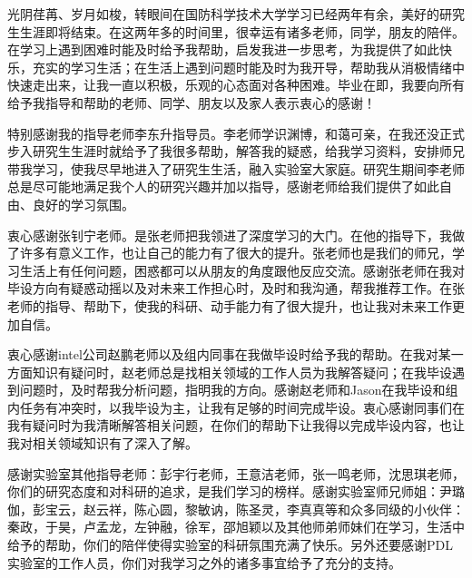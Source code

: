 

\begin{ack}
  光阴荏苒、岁月如梭，转眼间在国防科学技术大学学习已经两年有余，美好的研究生生涯即将结束。在这两年多的时间里，很幸运有诸多老师，同学，朋友的陪伴。在学习上遇到困难时能及时给予我帮助，启发我进一步思考，为我提供了如此快乐，充实的学习生活；在生活上遇到问题时能及时为我开导，帮助我从消极情绪中快速走出来，让我一直以积极，乐观的心态面对各种困难。毕业在即，我要向所有给予我指导和帮助的老师、同学、朋友以及家人表示衷心的感谢！
  
  特别感谢我的指导老师李东升指导员。李老师学识渊博，和蔼可亲，在我还没正式步入研究生生涯时就给予了我很多帮助，解答我的疑惑，给我学习资料，安排师兄带我学习，使我尽早地进入了研究生生活，融入实验室大家庭。研究生期间李老师总是尽可能地满足我个人的研究兴趣并加以指导，感谢老师给我们提供了如此自由、良好的学习氛围。
  
  衷心感谢张钊宁老师。是张老师把我领进了深度学习的大门。在他的指导下，我做了许多有意义工作，也让自己的能力有了很大的提升。张老师也是我们的师兄，学习生活上有任何问题，困惑都可以从朋友的角度跟他反应交流。感谢张老师在我对毕设方向有疑惑动摇以及对未来工作担心时，及时和我沟通，帮我推荐工作。在张老师的指导、帮助下，使我的科研、动手能力有了很大提升，也让我对未来工作更加自信。
  
  衷心感谢intel公司赵鹏老师以及组内同事在我做毕设时给予我的帮助。在我对某一方面知识有疑问时，赵老师总是找相关领域的工作人员为我解答疑问；在我毕设遇到问题时，及时帮我分析问题，指明我的方向。感谢赵老师和Jason在我毕设和组内任务有冲突时，以我毕设为主，让我有足够的时间完成毕设。衷心感谢同事们在我有疑问时为我清晰解答相关问题，在你们的帮助下让我得以完成毕设内容，也让我对相关领域知识有了深入了解。
  
  感谢实验室其他指导老师：彭宇行老师，王意洁老师，张一鸣老师，沈思琪老师，你们的研究态度和对科研的追求，是我们学习的榜样。感谢实验室师兄师姐：尹璐伽，彭宝云，赵云祥，陈心圆，黎敏讷，陈圣灵，李真真等和众多同级的小伙伴：秦政，于昊，卢孟龙，左钟融，徐军，邵旭颖以及其他师弟师妹们在学习，生活中给予的帮助，你们的陪伴使得实验室的科研氛围充满了快乐。另外还要感谢PDL实验室的工作人员，你们对我学习之外的诸多事宜给予了充分的支持。

\end{ack}
